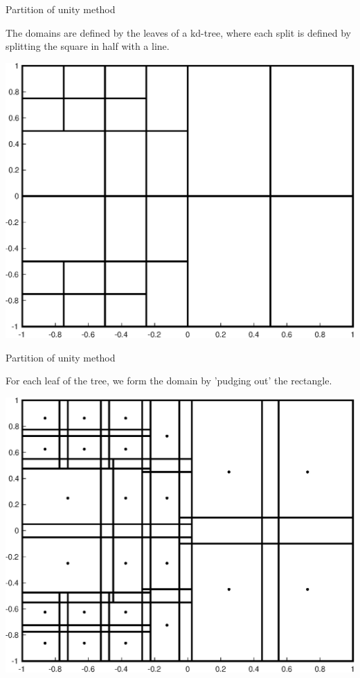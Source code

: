 \documentclass{beamer}
\begin{document}
\begin{frame}{Partition of unity method}
\begin{center}
The domains are defined by the leaves of a kd-tree, where each split is defined by splitting the square in half with a line.
\end{center}

\begin{center}
\includegraphics[scale = 0.4]{zonePlot.eps}
\end{center}
\end{frame}

\begin{frame}{Partition of unity method}
\begin{center}
For each leaf of the tree, we form the domain by 'pudging out' the rectangle.
\end{center}

\begin{center}
\includegraphics[scale = 0.4]{domainPlot.eps}
\end{center}
\end{frame}
\end{document}

